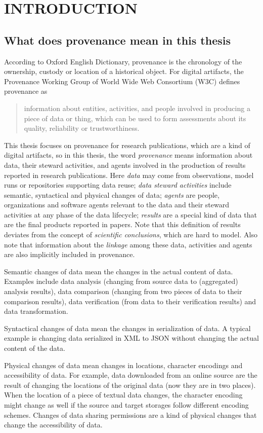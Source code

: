 \chapter{INTRODUCTION}
\section{What does provenance mean in this thesis}
According to Oxford English Dictionary, provenance is the chronology of the ownership, custody or location of a historical object. For digital artifacts, the Provenance Working Group of World Wide Web Consortium (W3C) defines provenance as \begin{quote}information about entities, activities, and people involved in producing a piece of data or thing, which can be used to form assessments about its quality, reliability or trustworthiness.\end{quote} This thesis focuses on provenance for research publications, which are a kind of digital artifacts, so in this thesis, the word \emph{provenance} means information about data, their steward activities, and agents involved in the production of results reported in research publications. Here \emph{data} may come from observations, model runs or repositories supporting data reuse; \emph{data steward activities} include semantic, syntactical and physical changes of data; \emph{agents} are people, organizations and software agents relevant to the data and their steward activities at any phase of the data lifecycle; \emph{results} are a special kind of data that are the final products reported in papers. Note that this definition of results deviates from the concept of \emph{scientific conclusions}, which are hard to model. Also note that information about the \emph{linkage} among these data, activities and agents are also implicitly included in provenance.

Semantic changes of data mean the changes in the actual content of data. Examples include data analysis (changing from source data to (aggregated) analysis results), data comparison (changing from two pieces of data to their comparison results), data verification (from data to their verification results) and data transformation. 

Syntactical changes of data mean the changes in serialization of data. A typical example is changing data serialized in XML to JSON without changing the actual content of the data.

Physical changes of data mean changes in locations, character encodings and accessibility of data. For example, data downloaded from an online source are the result of changing the locations of the original data (now they are in two places). When the location of a piece of textual data changes, the character encoding might change as well if the source and target storages follow different encoding schemes. Changes of data sharing permissions are a kind of physical changes that change the accessibility of data. 


